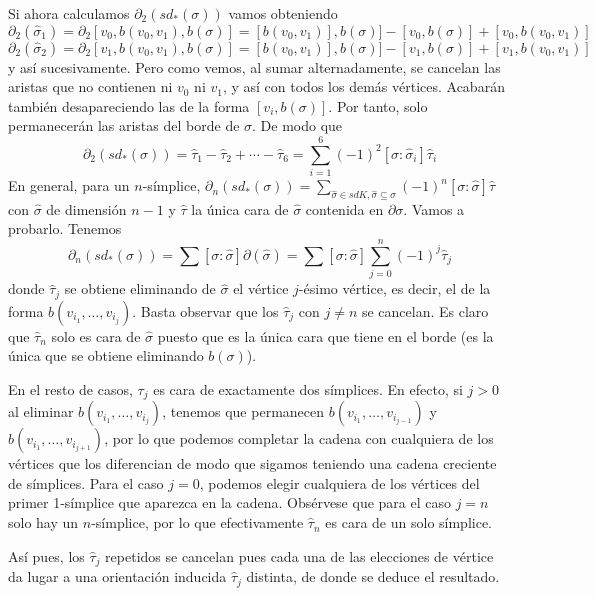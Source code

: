\documentclass[HS.tex]{subfiles}
\begin{document}
\begin{ej}
\begin{enumerate}
Si ahora calculamos $\partial_2(sd_*(\sigma))$ vamos obteniendo
\[
\partial_2(\hat{\sigma}_1)=\partial_2[v_0, b(v_0,v_1), b(\sigma)]=[b(v_0,v_1)],b(\sigma)]-[v_0,b(\sigma)]+[v_0,b(v_0,v_1)]
\]
\[
\partial_2(\hat{\sigma}_2)=\partial_2[v_1, b(v_0,v_1), b(\sigma)]=[b(v_0,v_1)],b(\sigma)]-[v_1,b(\sigma)]+[v_1,b(v_0,v_1)]
\]
y así sucesivamente. Pero como vemos, al sumar alternadamente, se cancelan las aristas que no contienen ni $v_0$ ni $v_1$, y así con todos los demás vértices. Acabarán también desapareciendo las de la forma $[v_i,b(\sigma)]$. Por tanto, solo permanecerán las aristas del borde de $\sigma$. De modo que
\[
\partial_2(sd_*(\sigma))=\hat{\tau}_1-\hat{\tau}_2+\cdots -\hat{\tau}_6=\sum_{i=1}^6(-1)^2[\sigma:\hat{\sigma}_i]\hat{\tau}_i
\]
En general, para un $n$-símplice, $\partial_n(sd_*(\sigma))=\sum_{\hat{\sigma}\in sdK,\hat{\sigma}\subseteq\sigma}(-1)^n[\sigma:\hat{\sigma}]\hat{\tau}$ con $\hat{\sigma}$ de dimensión $n-1$ y $\hat{\tau}$ la única cara de $\hat{\sigma}$ contenida en $\partial\sigma$. Vamos a probarlo. Tenemos
\[
\partial_n(sd_*(\sigma))=\sum[\sigma:\hat{\sigma}]\partial(\hat{\sigma})=\sum[\sigma:\hat{\sigma}]\sum_{j=0}^n (-1)^j\hat{\tau}_j
\]
donde $\hat{\tau}_j$ se obtiene eliminando de $\hat{\sigma}$ el vértice $j$-ésimo vértice, es decir, el de la forma $b(v_{i_1},\dots, v_{i_j})$. Basta observar que los $\hat{\tau}_j$ con $j\neq n$ se cancelan. Es claro que $\hat{\tau}_n$ solo es cara de $\hat{\sigma}$ puesto que es la única cara que tiene  en el borde (es la única que se obtiene eliminando $b(\sigma)$). 

En el resto de casos, $\tau_j$ es cara de exactamente dos símplices. En efecto, si $j>0$ al eliminar $b(v_{i_1},\dots, v_{i_j})$, tenemos que permanecen $b(v_{i_1},\dots, v_{i_{j-1}})$ y $b(v_{i_1},\dots, v_{i_{j+1}})$, por lo que podemos completar la cadena con cualquiera de los vértices que los diferencian de modo que sigamos teniendo una cadena creciente de símplices. Para el caso $j=0$, podemos elegir cualquiera de los vértices del primer 1-símplice que aparezca en la cadena. Obsérvese que para el caso $j=n$ solo hay un $n$-símplice, por lo que efectivamente $\hat{\tau}_n$ es cara de un solo símplice. 

Así pues, los $\hat{\tau}_j$ repetidos se cancelan pues cada una de las elecciones de vértice da lugar a una orientación inducida $\hat{\tau}_j$ distinta, de donde se deduce el resultado. 
\end{enumerate}
\end{ej}
\end{document}
